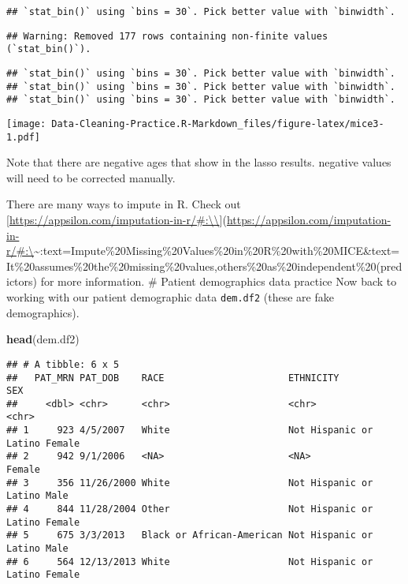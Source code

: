 \documentclass[
]{article}
\newenvironment{Shaded}{\begin{snugshade}}{\end{snugshade}}
\newcommand{\FunctionTok}[1]{\textcolor[rgb]{0.13,0.29,0.53}{\textbf{#1}}}
\newcommand{\NormalTok}[1]{#1}
\begin{document}
\begin{verbatim}
## `stat_bin()` using `bins = 30`. Pick better value with `binwidth`.
\end{verbatim}

\begin{verbatim}
## Warning: Removed 177 rows containing non-finite values (`stat_bin()`).
\end{verbatim}

\begin{verbatim}
## `stat_bin()` using `bins = 30`. Pick better value with `binwidth`.
## `stat_bin()` using `bins = 30`. Pick better value with `binwidth`.
## `stat_bin()` using `bins = 30`. Pick better value with `binwidth`.
\end{verbatim}

\texttt{[image: Data-Cleaning-Practice.R-Markdown\_files/figure-latex/mice3-1.pdf]}

Note that there are negative ages that show in the lasso results.
negative values will need to be corrected manually.

There are many ways to impute in R. Check out
{[}\href{https://appsilon.com/imputation-in-r/\#:/}{https://appsilon.com/imputation-in-r/\#:\textbackslash\textbackslash{}}{]}(\href{https://appsilon.com/imputation-in-r/\#:)\%7B.uri\%7D}{https://appsilon.com/imputation-in-r/\#:\textbackslash{}}\textasciitilde:text=Impute\%20Missing\%20Values\%20in\%20R\%20with\%20MICE\&text=It\%20assumes\%20the\%20missing\%20values,others\%20as\%20independent\%20(predictors)
for more information. \# Patient demographics data practice Now back to
working with our patient demographic data \texttt{dem.df2} (these are
fake demographics).

\begin{Shaded}
\begin{Highlighting}[]
\FunctionTok{head}\NormalTok{(dem.df2)}
\end{Highlighting}
\end{Shaded}

\begin{verbatim}
## # A tibble: 6 x 5
##   PAT_MRN PAT_DOB    RACE                      ETHNICITY              SEX   
##     <dbl> <chr>      <chr>                     <chr>                  <chr> 
## 1     923 4/5/2007   White                     Not Hispanic or Latino Female
## 2     942 9/1/2006   <NA>                      <NA>                   Female
## 3     356 11/26/2000 White                     Not Hispanic or Latino Male  
## 4     844 11/28/2004 Other                     Not Hispanic or Latino Female
## 5     675 3/3/2013   Black or African-American Not Hispanic or Latino Male  
## 6     564 12/13/2013 White                     Not Hispanic or Latino Female
\end{verbatim}
\end{document}
